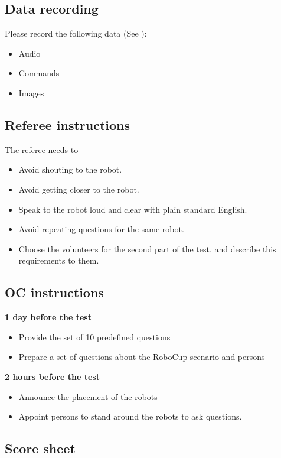 \subsection{Data recording}
  Please record the following data (See ):
  \begin{itemize}
   \item Audio
   \item Commands
   \item Images
  \end{itemize}

\subsection{Referee instructions}

The referee needs to
\begin{itemize}
\item Avoid shouting to the robot.
\item Avoid getting closer to the robot.
\item Speak to the robot loud and clear with plain standard English.
\item Avoid repeating questions for the same robot.
\item Choose the volunteers for the second part of the test, and describe this requirements to them.
\end{itemize}

\subsection{OC instructions}

\textbf{1 day before the test}
\begin{itemize}
\item Provide the set of 10 predefined questions
\item Prepare a set of questions about the RoboCup scenario and persons
\end{itemize}
\textbf{2 hours before the test}
\begin{itemize}
\item Announce the placement of the robots
\item Appoint persons to stand around the robots to ask questions. 
\end{itemize}

\subsection{Score sheet}



